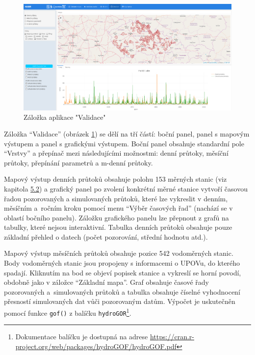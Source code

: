 \documentclass[12pt,]{article}
\let\rmarkdownfootnote\footnote%
\def\footnote{\protect\rmarkdownfootnote}
\begin{document}
\begin{figure}[H]
      \includegraphics[width=\textwidth]{fig/P_validace}
      \caption{Záložka aplikace "Validace"}
      \label{fig:ch5.6}
\end{figure}

\vspace*{-0.3cm}

\qquad Záložka \enquote{Validace} (obrázek \ref{fig:ch5.6}) se dělí na
tří částí: boční panel, panel s mapovým výstupem a panel s grafickými
výstupem. Boční panel obsahuje standardní pole \enquote{Vrstvy} a
přepínač mezi následujícími možnostmi: denní průtoky, měsíční průtoky,
přepínání parametrů a m-denní průtoky.

\qquad Mapový výstup denních průtoků obsahuje polohu 153 měrných stanic
(viz kapitola \protect\hyperlink{data}{5.2}) a grafický panel po zvolení
konkrétní měrné stanice vytvoří časovou řadou pozorovaných a
simulovaných průtoků, které lze vykreslit v denním, měsíčním a~ročním
kroku pomocí menu \enquote{Výběr časových řad} (nachází se v oblastí
bočního panelu). Záložku grafického panelu lze přepnout z grafů na
tabulky, které nejsou interaktivní. Tabulka denních průtoků obsahuje
pouze základní přehled o datech (počet pozorování, střední hodnotu
atd.).

\qquad Mapový výstup měsíčních průtoků obsahuje pozice 542 vodoměrných
stanic. Body vodoměrných stanic jsou propojeny s informacemi o UPOVu, do
kterého spadají. Kliknutím na bod se objeví popisek stanice a vykreslí
se horní povodí, obdobně jako v záložce \enquote{Základní mapa}. Graf
obsahuje časové řady pozorovaných a~simulovaných průtoků a tabulka
obsahuje číselné vyhodnocení přesností simulovaných dat vůči pozorovaným
datům. Výpočet je uskutečněn pomocí funkce \texttt{gof()} z balíčku
\texttt{hydroGOR}\footnote{Dokumentace balíčku je dostupná na adrese
  \url{https://cran.r-project.org/web/packages/hydroGOF/hydroGOF.pdf}}.
\end{document}
